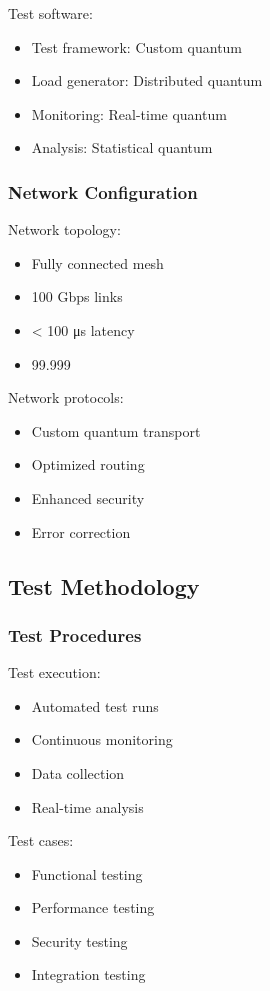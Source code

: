 \documentclass[12pt]{article}
\begin{document}
Test software:
\begin{itemize}
\item Test framework: Custom quantum
\item Load generator: Distributed quantum
\item Monitoring: Real-time quantum
\item Analysis: Statistical quantum
\end{itemize}

\subsubsection{Network Configuration}

Network topology:
\begin{itemize}
\item Fully connected mesh
\item 100 Gbps links
\item < 100 μs latency
\item 99.999%
\end{itemize}

Network protocols:
\begin{itemize}
\item Custom quantum transport
\item Optimized routing
\item Enhanced security
\item Error correction
\end{itemize}

\subsection{Test Methodology}

\subsubsection{Test Procedures}

Test execution:
\begin{itemize}
\item Automated test runs
\item Continuous monitoring
\item Data collection
\item Real-time analysis
\end{itemize}

Test cases:
\begin{itemize}
\item Functional testing
\item Performance testing
\item Security testing
\item Integration testing
\end{itemize}
\end{document}
